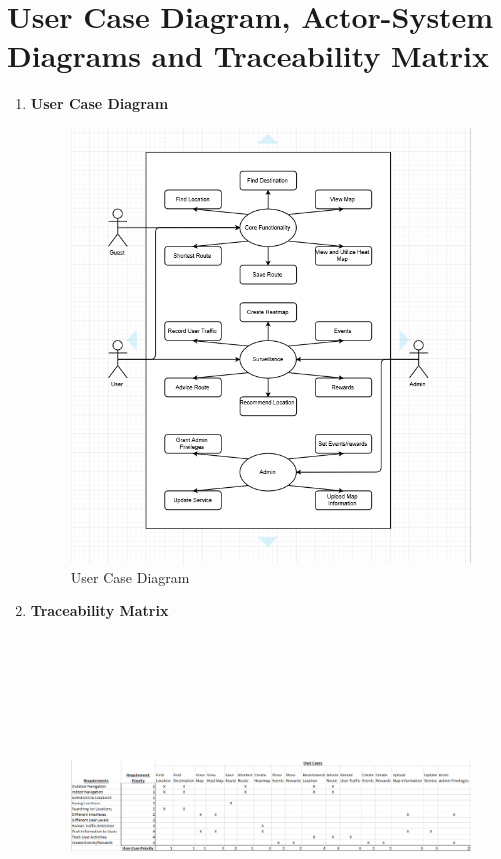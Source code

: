 \documentclass[a4paper,10pt]{article}
\begin{document}
\section{User Case Diagram, Actor-System Diagrams and Traceability Matrix}
\clearpage
\begin{enumerate} 
\item \textbf{User Case Diagram} 
		\begin{figure}
		\includegraphics[scale=1.2]{UserCaseDiagram}
		\caption{User Case Diagram}
		\end{figure}
\item \textbf{Traceability Matrix}
		\begin{figure}
		\includegraphics[width=17cm,height=9cm]{TraceabilityMatrix}

\end{figure}
\end{enumerate}
\end{document}
